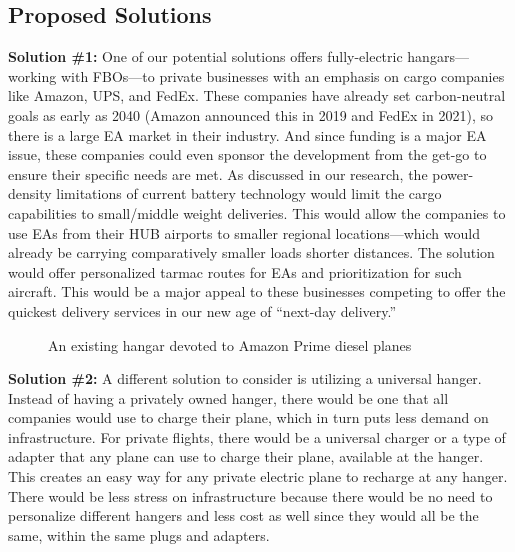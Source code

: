 \documentclass[../main.tex]{subfiles}
\begin{document}
\newpage
\subsection{Proposed Solutions}
\noindent\textbf{Solution \#1:}\newline
\indent One of our potential solutions offers fully-electric hangars—working with FBOs—to private businesses with an emphasis on cargo companies like Amazon, UPS, and FedEx. These companies have already set carbon-neutral goals as early as 2040 (Amazon announced this in 2019 and FedEx in 2021), so there is a large EA market in their industry. And since funding is a major EA issue, these companies could even sponsor the development from the get-go to ensure their specific needs are met. As discussed in our research, the power-density limitations of current battery technology would limit the cargo capabilities to small/middle weight deliveries. This would allow the companies to use EAs from their HUB airports to smaller regional locations—which would already be carrying comparatively smaller loads shorter distances. The solution would offer personalized tarmac routes for EAs and prioritization for such aircraft. This would be a major appeal to these businesses competing to offer the quickest delivery services in our new age of “next-day delivery.” \par
\begin{figure}[h!]
    \centering
    \caption{An existing hangar devoted to Amazon Prime diesel planes}
    \centering
\end{figure}
\newpage
\noindent\textbf{Solution \#2:}\newline
\indent A different solution to consider is utilizing a universal hanger. Instead of having a privately owned hanger, there would be one that all companies would use to charge their plane, which in turn puts less demand on infrastructure. For private flights, there would be a universal charger or a type of adapter that any plane can use to charge their plane, available at the hanger. This creates an easy way for any private electric plane to recharge at any hanger. There would be less stress on infrastructure because there would be no need to personalize different hangers and less cost as well since they would all be the same, within the same plugs and adapters. \par
\end{document}
